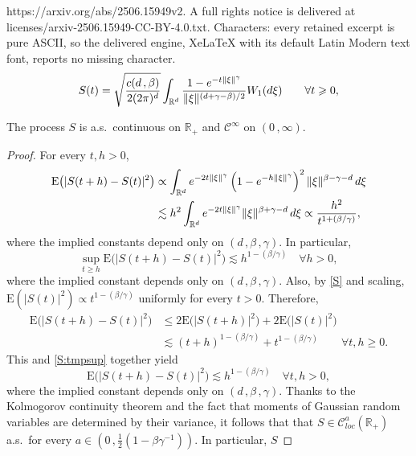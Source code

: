 \documentclass[10pt,a4paper]{amsart}
\newcommand{\E}{\mathrm{E}}
\newcommand{\R}{\mathbb{R}}
\newcommand{\cC}{\mathcal{C}}
\newcommand{\e}{{\rm e}}
\renewcommand{\d}{{\rm d}}
\renewcommand{\ge}{\geqslant}
\renewcommand{\le}{\leqslant}
\begin{document}
https://arxiv.org/abs/2506.15949v2. A full rights notice is delivered at licenses/arxiv-2506.15949-CC-BY-4.0.txt. Characters: every retained excerpt is pure ASCII, so the delivered engine, XeLaTeX with its default Latin Modern text font, reports no missing character.
\begin{align}\label{S}
	S(t) = \sqrt{\frac{c(d\,,\beta)}{2(2\pi)^{d}}} \int_{\R^d} \frac{1-\e^{-t\|\xi\|^\gamma}}{\|\xi\|^{(d+\gamma-\beta)/2}} W_1(\d\xi) \qquad \forall t \ge 0,
\end{align}

\begin{lemma}\label{lem:S:cont}
	The process $S$ is a.s.~continuous on $\R_+$ and $\cC^\infty$ on $(0\,,\infty)$.
\end{lemma}

\begin{proof}
	For every $t,h>0$,
	\begin{align*}
		\E\big( |S(t+h)-S(t)|^2\big) 
			&\propto \int_{\R^d} \e^{-2t\|\xi\|^\gamma}
			\left( 1 - \e^{-h\|\xi\|^\gamma} \right)^2 \|\xi\|^{\beta-\gamma-d}\, \d \xi\\
		&\lesssim h^2 \int_{\R^d}  \e^{-2t\|\xi\|^\gamma} \|\xi\|^{\beta+\gamma-d}\, \d \xi
			\propto \frac{h^2}{t^{1+(\beta/\gamma)}},
	\end{align*}
	where the implied constants depend only on $(d\,,\beta\,,\gamma)$.
	In particular, 
	\begin{equation}\label{S:tmpsup}
		\sup_{t\ge h}\E\big( |S(t+h)-S(t)|^2\big) \lesssim h^{1-(\beta/\gamma)}\quad
		\forall h>0,
	\end{equation}
	where the implied constant depends only on $(d\,,\beta\,,\gamma)$.
	Also, by \eqref{S} and scaling, $\E( |S(t)|^2)\propto t^{1-(\beta/\gamma)}$
	uniformly for every $t>0$. Therefore,
	\begin{align*}
		\E\big( |S(t+h)-S(t)|^2\big) &\le 2\E\big(|S(t+h)|^2\big)+2\E\big(|S(t)|^2\big)\\
		&\lesssim (t+h)^{1-(\beta/\gamma)}+ t^{1-(\beta/\gamma)}
			\qquad\forall t,h\ge0.
	\end{align*}
	This and \eqref{S:tmpsup} together yield
	\[
		\E\big( |S(t+h)-S(t)|^2\big) \lesssim h^{1-(\beta/\gamma)}
		\quad\forall t,h>0,
	\]
	where the implied constant depends only on $(d\,,\beta\,,\gamma)$. Thanks to the Kolmogorov
	continuity theorem and the fact that moments of Gaussian random variables
	are determined by their variance, it follows that that $S\in\cC^a_{\textit{loc}}(\R_+)$
	a.s.\ for every $a\in(0\,, \frac12(1-\beta\gamma^{-1}))$. In particular, $S$

\end{proof}
\end{document}
